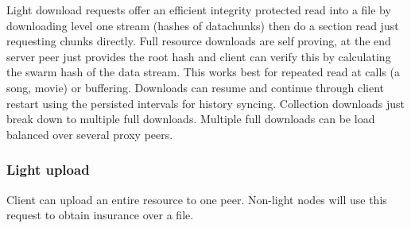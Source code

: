 Light download requests offer an efficient integrity protected read into a file by downloading level one stream (hashes of datachunks) then do a section read just requesting chunks directly. Full resource downloads are self proving, at the end server peer just provides the root hash and client can verify this by calculating the swarm hash of the data stream.
This works best for repeated read at calls (a song, movie) or buffering. Downloads can resume and continue through client restart using the persisted intervals for history syncing. Collection downloads just break down to multiple full downloads. Multiple full downloads can be load balanced over several proxy peers. 

\subsubsection{Light upload}

Client can upload an entire resource to one peer. Non-light nodes will use this request to obtain insurance over a file. 



